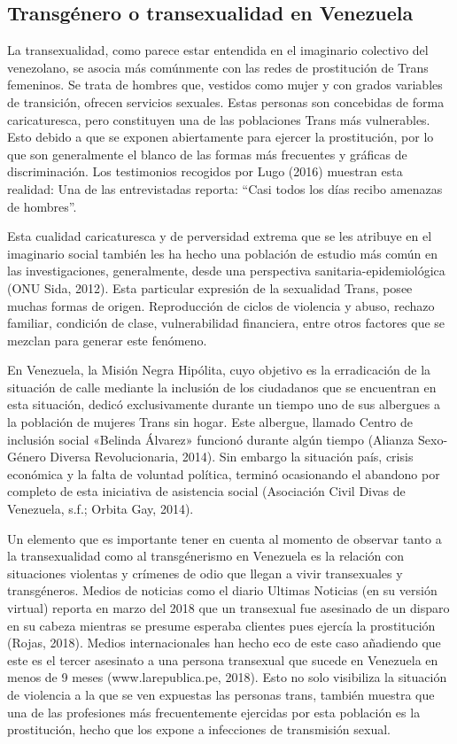\subsection{Transgénero o transexualidad en Venezuela}
La transexualidad, como parece estar entendida en el imaginario colectivo del
venezolano, se asocia más comúnmente con las redes de prostitución de Trans
femeninos.
Se trata de hombres que, vestidos como mujer y con grados variables de
transición, ofrecen servicios sexuales.
Estas personas son concebidas de forma caricaturesca, pero constituyen una de
las poblaciones Trans más vulnerables.
Esto debido a que se exponen abiertamente para ejercer la prostitución, por lo
que son generalmente el blanco de las formas más frecuentes y gráficas de
discriminación.
Los testimonios recogidos por Lugo (2016) muestran esta realidad: Una de las
entrevistadas reporta: “Casi todos los días recibo amenazas de hombres”.

Esta cualidad caricaturesca y de perversidad extrema que se les atribuye en el
imaginario social también les ha hecho una población de estudio más común en las
investigaciones, generalmente, desde una perspectiva sanitaria-epidemiológica
(ONU Sida, 2012).
Esta particular expresión de la sexualidad Trans, posee muchas formas de origen.
Reproducción de ciclos de violencia y abuso, rechazo familiar, condición de
clase, vulnerabilidad financiera, entre otros factores que se mezclan para
generar este fenómeno.

En Venezuela, la Misión Negra Hipólita, cuyo objetivo es la erradicación de la
situación de calle mediante la inclusión de los ciudadanos que se encuentran en
esta situación, dedicó exclusivamente durante un tiempo uno de sus albergues a
la población de mujeres Trans sin hogar.
Este albergue, llamado Centro de inclusión social «Belinda Álvarez» funcionó
durante algún tiempo (Alianza Sexo-Género Diversa Revolucionaria, 2014).
Sin embargo la situación país, crisis económica y la falta de voluntad política,
terminó ocasionando el abandono por completo de esta iniciativa de asistencia
social (Asociación Civil Divas de Venezuela, s.f.; Orbita Gay, 2014).

Un elemento que es importante tener en cuenta al momento de observar tanto a la
transexualidad como al transgénerismo en Venezuela es la relación con
situaciones violentas y crímenes de odio que llegan a vivir transexuales y
transgéneros.
Medios de noticias como el diario Ultimas Noticias (en su versión virtual)
reporta en marzo del 2018 que un transexual fue asesinado de un disparo en su
cabeza mientras se presume esperaba clientes pues ejercía la prostitución
(Rojas, 2018).
Medios internacionales han hecho eco de este caso añadiendo que este es el
tercer asesinato a una persona transexual que sucede en Venezuela en menos de 9
meses (www.larepublica.pe, 2018).
Esto no solo visibiliza la situación de violencia a la que se ven expuestas las
personas trans, también muestra que una de las profesiones más frecuentemente
ejercidas por esta población es la prostitución, hecho que los expone a
infecciones de transmisión sexual.

